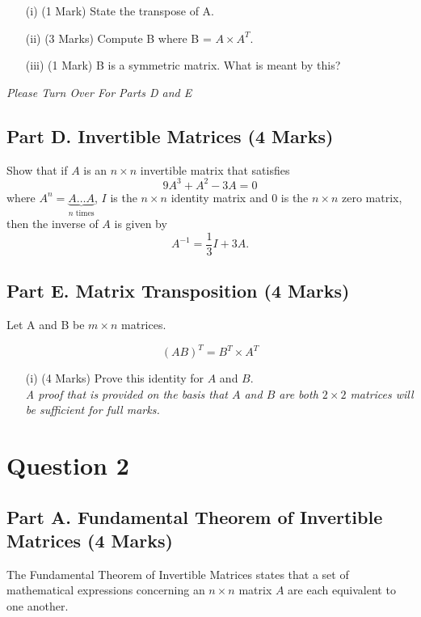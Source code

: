 \documentclass[a4paper,12pt]{article}
\begin{document}
		\begin{itemize}
			\item[(i)] (1 Mark) State the transpose of A.
			\item[(ii)] (3 Marks) Compute B where B = $ A \times A^{T}$. 
			\item[(iii)] (1 Mark) B is a symmetric matrix. What is meant by this?
		\end{itemize}
		\noindent 	\textit{Please Turn Over For Parts D and E}
	\newpage
			\subsection*{Part D. Invertible Matrices (4 Marks)}	
	\noindent	Show that if $A$ is an $n\times n$ invertible matrix that satisfies 
	$$
	9A^3+A^2-3A=0
	$$
	where $A^n=\underbrace{A\ldots A}_{\textrm{$n$ times}}$, %
	$I$ is the $n\times n$  identity matrix and $0$ is the $n\times n$  zero matrix,
	then the inverse of $A$ is given by  %
	$$
	A^{-1}=\frac13I+3A.
	$$
		\smallskip
		\subsection*{Part E. Matrix Transposition (4 Marks)}	
Let A and B be $m \times n$ matrices. 
	
\[	(AB)^{T} = B^T \times A^T\]

\begin{itemize}
\item[(i)] (4 Marks) Prove this identity for $A$ and $B$.\\ \smallskip \textit{A proof that is provided on the basis that $A$ and $B$ are both $2 \times 2$ matrices will be sufficient for full marks.}
\end{itemize}
\newpage
\section*{Question 2}
	\subsection*{Part A. Fundamental Theorem of Invertible Matrices  (4 Marks)}
	The Fundamental Theorem of Invertible Matrices states that a set of mathematical expressions concerning an $n\times n$ matrix $A$ are each equivalent to one another.
	
\end{document}
